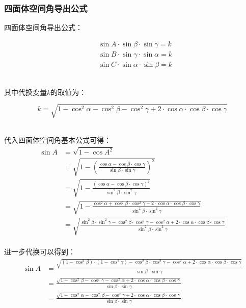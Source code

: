 \documentclass[UTF8]{ctexart}
\begin{document}
\subsubsection{四面体空间角导出公式}
    四面体空间角导出公式：
    \begin{large}
        \begin{align*}
            &\sin{A}\cdot\sin{\beta}\cdot\sin{\gamma}=k\\[3mm]
            &\sin{B}\cdot\sin{\gamma}\cdot\sin{\alpha}=k\\[3mm]
            &\sin{C}\cdot\sin{\alpha}\cdot\sin{\beta}=k
        \end{align*}
    \end{large}\\
    其中代换变量$k$的取值为：\vspace{5pt}
    \begin{large}
        \begin{equation*}
            k=\sqrt{1-\cos^2{\alpha}-\cos^2{\beta}-\cos^2{\gamma}+2\cdot\cos{\alpha}\cdot\cos{\beta}\cdot\cos{\gamma}}
        \end{equation*}
    \end{large}\\[3mm]
    代入四面体空间角基本公式可得：\vspace{5pt}
    \setcounter{equation}{0}
    \begin{align}
        \sin{A}
        &=\sqrt{1-\cos{A}^2}\\[3mm]
        &=\sqrt{1-\left(\frac{\cos{\alpha}-\cos{\beta}\cdot\cos{\gamma}}{\sin{\beta}\cdot\sin{\gamma}}\right)^2}\\[3mm]
        &=\sqrt{1-\frac{\left(\cos{\alpha}-\cos{\beta}\cdot\cos{\gamma}\right)^2}{\sin^2{\beta}\cdot\sin^2{\gamma}}}\\[3mm]
        &=\sqrt{1-\frac{\cos^2{\alpha}+\cos^2{\beta}\cdot\cos^2{\gamma}-2\cdot\cos{\alpha}\cdot\cos{\beta}\cdot\cos{\gamma}}{\sin^2{\beta}\cdot\sin^2{\gamma}}}\\[3mm]
        &=\sqrt{\frac{\sin^2{\beta}\cdot\sin^2{\gamma}-\cos^2{\beta}\cdot\cos^2{\gamma}-\cos^2{\alpha}+2\cdot\cos{\alpha}\cdot\cos{\beta}\cdot\cos{\gamma}}{\sin^2{\beta}\cdot\sin^2{\gamma}}}
    \end{align}\\
    进一步代换可以得到：\vspace{5pt}
    \begin{align}
        \sin{A}
        &=\frac{\sqrt{\left(1-\cos^2{\beta}\right)\cdot\left(1-\cos^2{\gamma}\right)-\cos^2{\beta}\cdot\cos^2{\gamma}-\cos^2{\alpha}+2\cdot\cos{\alpha}\cdot\cos{\beta}\cdot\cos{\gamma}}}{\sin{\beta}\cdot\sin{\gamma}}\\[3mm]
        &=\frac{\sqrt{1-\cos^2{\beta}-\cos^2{\gamma}-\cos^2{\alpha}+2\cdot\cos{\alpha}\cdot\cos{\beta}\cdot\cos{\gamma}}}{\sin{\beta}\cdot\sin{\gamma}}\\[3mm]
        &=\frac{\sqrt{1-\cos^2{\alpha}-\cos^2{\beta}-\cos^2{\gamma}+2\cdot\cos{\alpha}\cdot\cos{\beta}\cdot\cos{\gamma}}}{\sin{\beta}\cdot\sin{\gamma}}
    \end{align}\\
\end{document}
